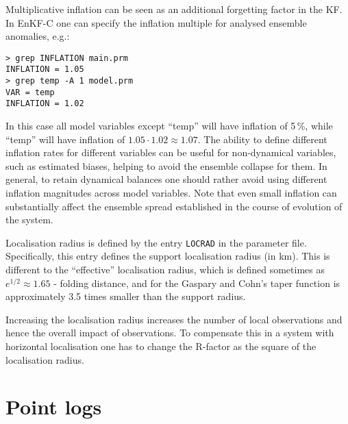\documentclass[11pt]{report}
\begin{document}
Multiplicative inflation can be seen as an additional forgetting factor in the KF.
In EnKF-C one can specify the inflation multiple for analysed ensemble anomalies, e.g.:
\begin{Verbatim}[frame=single,fontsize=\footnotesize]
> grep INFLATION main.prm
INFLATION = 1.05
> grep temp -A 1 model.prm
VAR = temp
INFLATION = 1.02
\end{Verbatim}
In this case all model variables except ``temp'' will have inflation of 5\,\%, while ``temp'' will have inflation of $1.05 \cdot 1.02 \approx 1.07$.
The ability to define different inflation rates for different variables can be useful for non-dynamical variables, such as estimated biases, helping to avoid the ensemble collapse for them.
In general, to retain dynamical balances one should rather avoid using different inflation magnitudes across model variables.
Note that even small inflation can substantially affect the ensemble spread established in the course of evolution of the system.

Localisation radius is defined by the entry \verb|LOCRAD| in the parameter file.
Specifically, this entry defines the support localisation radius (in km).
This is different to the ``effective'' localisation radius, which is defined sometimes as $e^{1/2}\approx 1.65$ - folding distance, and for the Gaspary and Cohn's taper function is approximately 3.5 times smaller than the support radius.

Increasing the localisation radius increases the number of local observations and hence the overall impact of observations.
To compensate this in a system with horizontal localisation one has to change the R-factor as the square of the localisation radius.

\section{Point logs}
\end{document}
